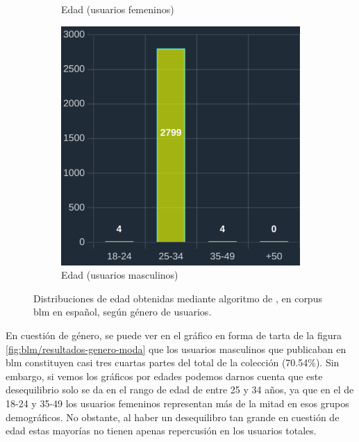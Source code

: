\begin{figure}[H]
\begin{subfigure}{0.3\textwidth}
  \caption{Edad (usuarios femeninos)} 
  \end{subfigure}
  \begin{subfigure}{0.3\textwidth}
   \includegraphics[width=\textwidth]{imaxes/capturas-app/graficos/modaresi/grafico-edad-moda-masc.png}
  \caption{Edad (usuarios masculinos)} 
  \end{subfigure}
  \caption{Distribuciones de edad obtenidas mediante algoritmo de \citet{modaresi:2016}, en corpus \acrshort{blm} en español, según género de usuarios.}
  \label{fig:blm/resultados-edad-moda}
\end{figure}

En cuestión de género, se puede ver en el gráfico en forma de tarta de la figura \ref{fig:blm/resultados-genero-moda} que los usuarios masculinos que publicaban en \acrshort{blm} constituyen casi tres cuartas partes del total de la colección (70.54\%). Sin embargo, si vemos los gráficos por edades podemos darnos cuenta que este desequilibrio solo se da en el rango de edad de entre 25 y 34 años, ya que en el de 18-24 y 35-49 los usuarios femeninos representan más de la mitad en esos grupos demográficos. No obstante, al haber un desequilibro tan grande en cuestión de edad estas mayorías no tienen apenas repercusión en los usuarios totales.

